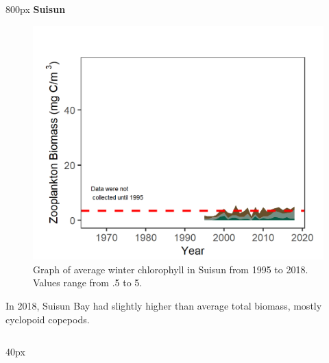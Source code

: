 \documentclass[
]{book}
\begin{document}
\begin{column}{800px\textwidth}
\textbf{Suisun}

\begin{figure}
\includegraphics[width=15.25in]{figures/zoops_sswinter} \caption{Graph of average winter chlorophyll in Suisun from 1995 to 2018. Values range from .5 to 5.}\label{fig:unnamed-chunk-166}
\end{figure}

In 2018, Suisun Bay had slightly higher than average total biomass, mostly cyclopoid copepods.
\end{column}

\begin{column}{40px\textwidth}
~
\end{column}
\end{document}
